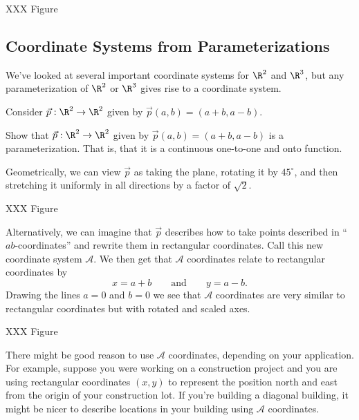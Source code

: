 XXX Figure

\subsection{Coordinate Systems from Parameterizations}
We've looked at several important coordinate systems for $\R^2$ and $\R^3$,
but any parameterization of $\R^2$ or $\R^3$ gives rise to a coordinate system.

Consider $\vec p:\R^2\to\R^2$ given by $\vec p(a,b)=(a+b,a-b)$.  

\begin{exercise}
	Show that $\vec p:\R^2\to\R^2$ given by $\vec p(a,b)=(a+b,a-b)$ is
	a parameterization.  That is, that it is a continuous 
	one-to-one and onto function.
\end{exercise}

Geometrically, we can view $\vec p$ as taking the plane, rotating it by $45^\circ$,
and then
stretching it uniformly in all directions by a factor of $\sqrt{2}$.

XXX Figure

Alternatively, we can imagine that $\vec p$ describes how to take points described
in ``$ab$-coordinates'' and rewrite them in rectangular coordinates.  Call this new coordinate
system $\mathcal A$. We then get that
$\mathcal A$ coordinates relate to rectangular coordinates by
\[
	x=a+b\qquad\text{and}\qquad y=a-b.
\]
Drawing the lines $a=0$ and $b=0$ we see that $\mathcal A$ coordinates are very similar to
rectangular coordinates but with rotated and scaled axes.

XXX Figure

There might be good reason to use $\mathcal A$ coordinates, depending on your application.
For example, suppose you were working on a construction project and you are using rectangular
coordinates $(x,y)$ to represent the position north and east from the origin of your construction
lot.  If you're building a diagonal building, it might be nicer to describe locations in your building
using $\mathcal A$ coordinates.

\bigskip

